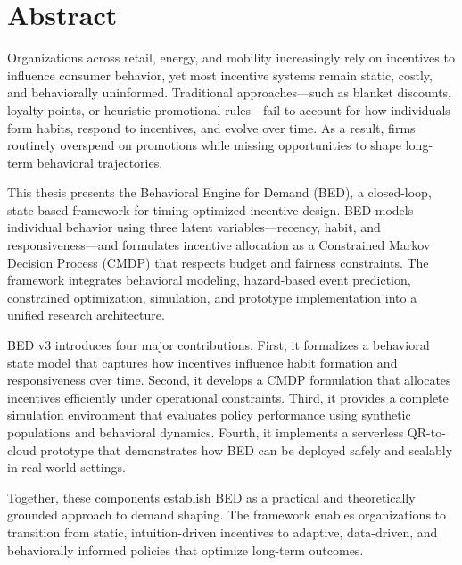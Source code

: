 \chapter*{Abstract}

Organizations across retail, energy, and mobility increasingly rely on
incentives to influence consumer behavior, yet most incentive systems remain
static, costly, and behaviorally uninformed. Traditional approaches—such as
blanket discounts, loyalty points, or heuristic promotional rules—fail to
account for how individuals form habits, respond to incentives, and evolve over
time. As a result, firms routinely overspend on promotions while missing
opportunities to shape long-term behavioral trajectories.

This thesis presents the Behavioral Engine for Demand (BED), a closed-loop,
state-based framework for timing-optimized incentive design. BED models
individual behavior using three latent variables—recency, habit, and
responsiveness—and formulates incentive allocation as a Constrained Markov
Decision Process (CMDP) that respects budget and fairness constraints. The
framework integrates behavioral modeling, hazard-based event prediction,
constrained optimization, simulation, and prototype implementation into a
unified research architecture.

BED v3 introduces four major contributions. First, it formalizes a behavioral
state model that captures how incentives influence habit formation and
responsiveness over time. Second, it develops a CMDP formulation that allocates
incentives efficiently under operational constraints. Third, it provides a
complete simulation environment that evaluates policy performance using
synthetic populations and behavioral dynamics. Fourth, it implements a
serverless QR-to-cloud prototype that demonstrates how BED can be deployed
safely and scalably in real-world settings.

Together, these components establish BED as a practical and theoretically
grounded approach to demand shaping. The framework enables organizations to
transition from static, intuition-driven incentives to adaptive, data-driven,
and behaviorally informed policies that optimize long-term outcomes.
